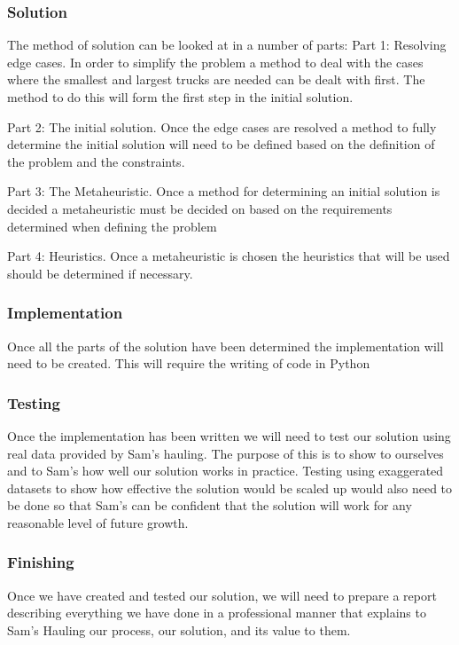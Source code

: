 \documentclass{article}
\begin{document}
\subsubsection{Solution}
The method of solution can be looked at in a number of parts:
Part 1: Resolving edge cases. 
In order to simplify the problem a method to deal with the cases where the smallest and largest trucks are needed can be dealt with first. The method to do this will form the first step in the initial solution.

Part 2: The initial solution.
Once the edge cases are resolved a method to fully determine the initial solution will need to be defined based on the definition of the problem and the constraints.

Part 3: The Metaheuristic.
Once a method for determining an initial solution is decided a metaheuristic must be decided on based on the requirements determined when defining the problem

Part 4: Heuristics.
Once a metaheuristic is chosen the heuristics that will be used should be determined if necessary.

\subsubsection{Implementation}
Once all the parts of the solution have been determined the implementation will need to be created. This will require the writing of code in Python

\subsubsection{Testing}
Once the implementation has been written we will need to test our solution using real data provided by Sam's hauling. The purpose of this is to show to ourselves and to Sam's how well our solution works in practice. Testing using exaggerated datasets to show how effective the solution would be scaled up would also need to be done so that Sam's can be confident that the solution will work for any reasonable level of future growth.

\subsubsection{Finishing}
Once we have created and tested our solution, we will need to prepare a report describing everything we have done in a professional manner that explains to Sam's Hauling our process, our solution, and its value to them.
\end{document}

